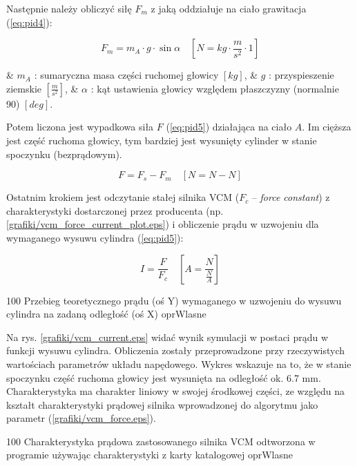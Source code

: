 Następnie należy obliczyć siłę $ F_m $ z jaką oddziałuje na ciało grawitacja (\ref{eq:pid4}):

\begin{equation} \label{eq:pid4}
	F_m = m_A \cdot g \cdot \sin \alpha \quad [ N = kg \cdot \frac{m}{s^2} \cdot 1 ]
\end{equation}

\begin{easylist}
	& $ m_A $ : sumaryczna masa części ruchomej głowicy $ [kg] $,
	& $ g $ : przyspieszenie ziemskie $ [\frac{m}{s^2}] $,
	& $ \alpha $ : kąt ustawienia głowicy względem płaszczyzny (normalnie 90\degree{}) $ [deg] $.
	\\
\end{easylist} 

Potem liczona jest wypadkowa siła $ F $ (\ref{eq:pid5}) działająca na ciało $ A $. Im cięższa jest część ruchoma głowicy, tym bardziej jest wysunięty cylinder w stanie spoczynku (bezprądowym). 

\begin{equation} \label{eq:pid5}
	F = F_s - F_m \quad [ N = N - N ]
\end{equation}

Ostatnim krokiem jest odczytanie stałej silnika VCM ($ F_c $ -- {\it force constant}) z charakterystyki dostarczonej przez producenta (np. \ref{grafiki/vcm_force_current_plot.eps}) i obliczenie prądu w uzwojeniu dla wymaganego wysuwu cylindra (\ref{eq:pid5}):

\begin{equation} \label{eq:pid6}
	I = \frac{F}{F_c} \quad [ A = \frac{N}{\frac{N}{A}} ]
\end{equation}

	{100}
	{Przebieg teoretycznego prądu (oś Y) wymaganego w uzwojeniu do wysuwu cylindra na zadaną odległość (oś X)}
	{oprWlasne}
	
Na rys. \ref{grafiki/vcm_current.eps} widać wynik symulacji w postaci prądu w funkcji wysuwu cylindra. Obliczenia zostały przeprowadzone przy rzeczywistych wartościach parametrów układu napędowego. Wykres wskazuje na to, że w stanie spoczynku część ruchoma głowicy jest wysunięta na odległość ok. 6.7 mm. Charakterystyka ma charakter liniowy w swojej środkowej części, ze względu na kształt charakterystyki prądowej silnika wprowadzonej do algorytmu jako parametr (\ref{grafiki/vcm_force.eps}).

	{100}
	{Charakterystyka prądowa zastosowanego silnika VCM odtworzona w programie używając charakterystyki z karty katalogowej}
	{oprWlasne}

